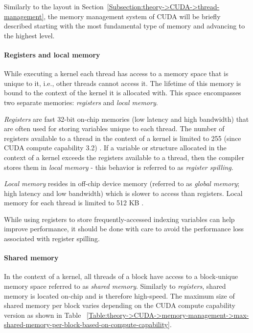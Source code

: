 Similarly to the layout in Section~\ref{Subsection:theory->CUDA->thread-management}, the memory management system of CUDA will be briefly described starting with the most fundamental type of memory and advancing to the highest level.

\paragraph{Registers and local memory} While executing a kernel each thread has access to a memory space that is unique to it, i.e., other threads cannot access it.
The lifetime of this memory is bound to the context of the kernel it is allocated with.
This space encompasses two separate memories: \textit{registers} and \textit{local memory}.

\textit{Registers} are fast 32-bit on-chip memories (low latency and high bandwidth) that are often used for storing variables unique to each thread.
The number of registers available to a thread in the context of a kernel is limited to 255 (since CUDA compute capability 3.2) \cite{NVIDIADecember2022}.
If a variable or structure allocated in the context of a kernel exceeds the registers available to a thread, then the compiler stores them in \textit{local memory} - this behavior is referred to as \textit{register spilling}.

\textit{Local memory} resides in off-chip device memory (referred to as \textit{global memory}; high latency and low bandwidth) which is slower to access than registers.
Local memory for each thread is limited to 512 KB \cite{NVIDIADecember2022}.

While using registers to store frequently-accessed indexing variables can help improve performance, it should be done with care to avoid the performance loss associated with register spilling.

\paragraph{Shared memory} In the context of a kernel, all threads of a block have access to a block-unique memory space referred to as \textit{shared memory}.
Similarly to \textit{registers}, shared memory is located on-chip and is therefore high-speed.
The maximum size of shared memory per block varies depending on the CUDA compute capability version as shown in Table ~\ref{Table:theory->CUDA->memory-management->max-shared-memory-per-block-based-on-compute-capability}.

